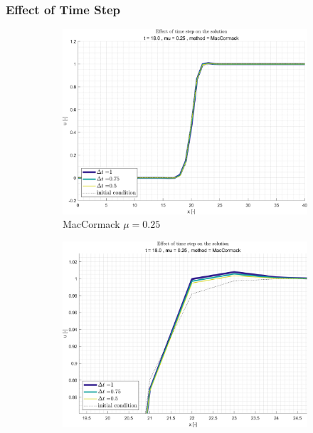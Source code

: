 \documentclass[11pt, a4paper]{article}
\begin{document}
\subsubsection{Effect of Time Step}
\begin{figure}[H]
    \centering
    \begin{subfigure}[c]{.39\textwidth}
        \centering
        \includegraphics[width=\textwidth]{images/grap10.png}
        \caption{MacCormack $\mu=0.25$}
        \label{fig:MacCormack_general_mu0.25_A}
    \end{subfigure}
    \begin{subfigure}[c]{.39\textwidth}
        \centering
        \includegraphics[width=\textwidth]{images/grap10.1.png}

\end{subfigure}
\end{figure}
\end{document}
